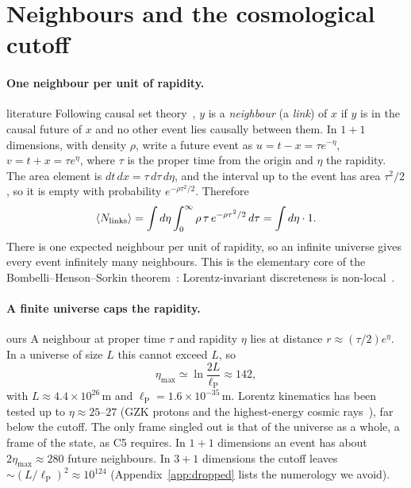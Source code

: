 \documentclass[11pt,a4paper]{article}
\newcommand{\tagbox}[2]{\textsf{\scriptsize\colorbox{#1!12}{\textcolor{#1!70!black}{#2}}}}
\newcommand{\lit}{\tagbox{blue}{literature}}
\newcommand{\ours}{\tagbox{orange}{ours}}
\newcommand{\lP}{\ell_{\mathrm P}}
\begin{document}
\section{Neighbours and the cosmological cutoff}\label{sec:cutoff}
\paragraph{One neighbour per unit of rapidity.} \lit{} Following causal set theory~\cite{BLMS87,Surya19}, $y$ is a \emph{neighbour} (a \emph{link}) of $x$ if $y$ is in the causal future of $x$ and no other event lies causally between them. In $1+1$ dimensions, with density $\rho$, write a future event as $u=t-x=\tau e^{-\eta}$, $v=t+x=\tau e^{\eta}$, where $\tau$ is the proper time from the origin and $\eta$ the rapidity. The area element is $dt\,dx=\tau\,d\tau\,d\eta$, and the interval up to the event has area $\tau^2/2$, so it is empty with probability $e^{-\rho\tau^2/2}$. Therefore
\begin{equation}
\langle N_{\rm links}\rangle=\int d\eta\int_0^\infty \rho\,\tau\,e^{-\rho\tau^2/2}\,d\tau=\int d\eta\cdot 1 .
\label{eq:onepereta}
\end{equation}
There is one expected neighbour per unit of rapidity, so an infinite universe gives every event infinitely many neighbours. This is the elementary core of the Bombelli--Henson--Sorkin theorem~\cite{BHS06}: Lorentz-invariant discreteness is non-local~\cite{Sorkin07}.

\paragraph{A finite universe caps the rapidity.} \ours{} A neighbour at proper time $\tau$ and rapidity $\eta$ lies at distance $r\approx(\tau/2)e^{\eta}$. In a universe of size $L$ this cannot exceed $L$, so
\begin{equation}
\eta_{\max}\simeq\ln\frac{2L}{\lP}\approx142,
\end{equation}
with $L\approx4.4\times10^{26}$\,m and $\lP=1.6\times10^{-35}$\,m. Lorentz kinematics has been tested up to $\eta\approx25$--$27$ (GZK protons and the highest-energy cosmic rays~\cite{CG99}), far below the cutoff. The only frame singled out is that of the universe as a whole, a frame of the state, as C5 requires. In $1+1$ dimensions an event has about $2\eta_{\max}\approx280$ future neighbours. In $3+1$ dimensions the cutoff leaves $\sim(L/\lP)^2\approx10^{124}$ (Appendix~\ref{app:dropped} lists the numerology we avoid).
\end{document}

